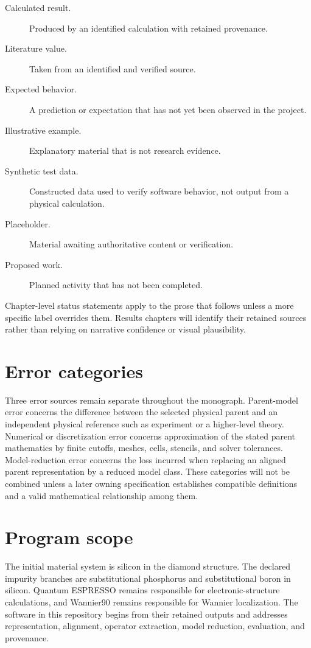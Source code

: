 \begin{description}
  \item[Calculated result.] Produced by an identified calculation with retained
    provenance.
  \item[Literature value.] Taken from an identified and verified source.
  \item[Expected behavior.] A prediction or expectation that has not yet been
    observed in the project.
  \item[Illustrative example.] Explanatory material that is not research
    evidence.
  \item[Synthetic test data.] Constructed data used to verify software behavior,
    not output from a physical calculation.
  \item[Placeholder.] Material awaiting authoritative content or verification.
  \item[Proposed work.] Planned activity that has not been completed.
\end{description}

Chapter-level status statements apply to the prose that follows unless a more
specific label overrides them. Results chapters will identify their retained
sources rather than relying on narrative confidence or visual plausibility.

\section*{Error categories}


Three error sources remain separate throughout the monograph. Parent-model
error concerns the difference between the selected physical parent and an
independent physical reference such as experiment or a higher-level theory.
Numerical or discretization error concerns approximation of the stated parent
mathematics by finite cutoffs, meshes, cells, stencils, and solver tolerances.
Model-reduction error concerns the loss incurred when replacing an aligned
parent representation by a reduced model class. These categories will not be
combined unless a later owning specification establishes compatible definitions
and a valid mathematical relationship among them.

\section*{Program scope}

The initial material system is silicon in the diamond structure. The declared
impurity branches are substitutional phosphorus and substitutional boron in
silicon. Quantum ESPRESSO remains responsible for electronic-structure
calculations, and Wannier90 remains responsible for Wannier localization. The
software in this repository begins from their retained outputs and addresses
representation, alignment, operator extraction, model reduction, evaluation,
and provenance.

